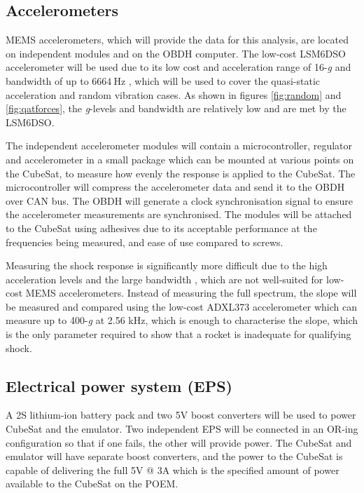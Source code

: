 \documentclass[a4paper,11pt]{article}
\begin{document}
\subsection{Accelerometers}
MEMS accelerometers, which will provide the data for this analysis, are located on independent modules and on the OBDH computer. The low-cost LSM6DSO accelerometer will be used due to its low cost and acceleration range of 16-\textit{g} and bandwidth of up to $\SI{6664}{\hertz}$ \cite{lsm6dso-datasheet}, which will be used to cover the quasi-static acceleration and random vibration cases. As shown in figures \ref{fig:random} and \ref{fig:qatforces}, the \textit{g}-levels and bandwidth are relatively low and are met by the LSM6DSO.

The independent accelerometer modules will contain a microcontroller, regulator and accelerometer in a small package which can be mounted at various points on the CubeSat, to measure how evenly the response is applied to the CubeSat. The microcontroller will compress the accelerometer data and send it to the OBDH over CAN bus. The OBDH will generate a clock synchronisation signal to ensure the accelerometer measurements are synchronised. The modules will be attached to the CubeSat using adhesives due to its acceptable performance at the frequencies being measured, and ease of use compared to screws.

Measuring the shock response is significantly more difficult due to the high acceleration levels and the large bandwidth \cite{nasa-pyroshock}, which are not well-suited for low-cost MEMS accelerometers. Instead of measuring the full spectrum, the slope will be measured and compared using the low-cost ADXL373 accelerometer which can measure up to 400-\textit{g} at 2.56 kHz, which is enough to characterise the slope, which is the only parameter required to show that a rocket is inadequate for qualifying shock.


\subsection{Electrical power system (EPS)}
A 2S lithium-ion battery pack and two 5V boost converters will be used to power CubeSat and the emulator. Two independent EPS will be connected in an OR-ing configuration so that if one fails, the other will provide power. The CubeSat and emulator will have separate boost converters, and the power to the CubeSat is capable of delivering the full 5V @ 3A which is the specified amount of power available to the CubeSat on the POEM.
\end{document}

